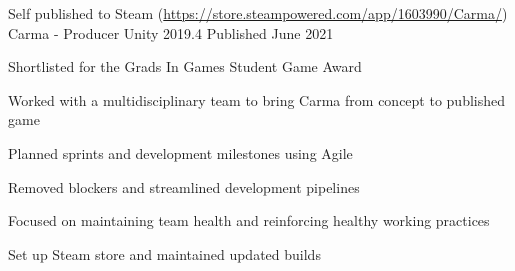 \begin{cventries}
    \cventry
    {Self published to Steam (\href{https://store.steampowered.com/app/1603990/Carma/}{https://store.steampowered.com/app/1603990/Carma/})}
    {Carma - Producer}
    {Unity 2019.4}
    {Published June 2021}
    {
        \begin{cvitems}
            \item Shortlisted for the Grads In Games Student Game Award
            \item Worked with a multidisciplinary team to bring Carma from concept to published game
            \item Planned sprints and development milestones using Agile
            \item Removed blockers and streamlined development pipelines
            \item Focused on maintaining team health and reinforcing healthy working practices
            \item Set up Steam store and maintained updated builds
        \end{cvitems}
    }

\end{cventries}